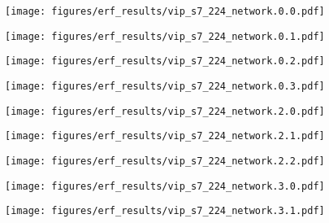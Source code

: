 \documentclass{article}
\begin{document}
\begin{figure}[tb]
  \raggedright
  \begin{minipage}[t]{0.13\hsize}
    \centering
    \texttt{[image: figures/erf\_results/vip\_s7\_224\_network.0.0.pdf]}
    \label{figure:erf_vip:0}
  \end{minipage}
  \begin{minipage}[t]{0.13\hsize}
    \centering
    \texttt{[image: figures/erf\_results/vip\_s7\_224\_network.0.1.pdf]}
    \label{figure:erf_vip:1}
  \end{minipage}
  \begin{minipage}[t]{0.13\hsize}
    \centering
    \texttt{[image: figures/erf\_results/vip\_s7\_224\_network.0.2.pdf]}
    \label{figure:erf_vip:2}
  \end{minipage}
  \begin{minipage}[t]{0.13\hsize}
    \centering
    \texttt{[image: figures/erf\_results/vip\_s7\_224\_network.0.3.pdf]}
    \label{figure:erf_vip:3}
  \end{minipage}
  \begin{minipage}[t]{0.13\hsize}
    \centering
    \texttt{[image: figures/erf\_results/vip\_s7\_224\_network.2.0.pdf]}
    \label{figure:erf_vip:4}
  \end{minipage}
  \begin{minipage}[t]{0.13\hsize}
    \centering
    \texttt{[image: figures/erf\_results/vip\_s7\_224\_network.2.1.pdf]}
    \label{figure:erf_vip:5}
  \end{minipage}
  \begin{minipage}[t]{0.13\hsize}
    \centering
    \texttt{[image: figures/erf\_results/vip\_s7\_224\_network.2.2.pdf]}
    \label{figure:erf_vip:6}
  \end{minipage}
  \begin{minipage}[t]{0.13\hsize}
    \centering
    \texttt{[image: figures/erf\_results/vip\_s7\_224\_network.3.0.pdf]}
    \label{figure:erf_vip:7}
  \end{minipage}
  \begin{minipage}[t]{0.13\hsize}
    \centering
    \texttt{[image: figures/erf\_results/vip\_s7\_224\_network.3.1.pdf]}
    \label{figure:erf_vip:8}

\end{minipage}
\end{figure}
\end{document}
